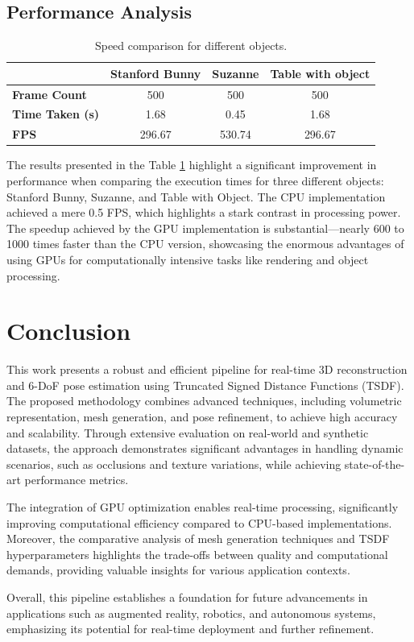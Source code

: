 \documentclass[conference]{IEEEtran}
\begin{document}
\subsection{Performance Analysis}
\begin{table}[htbp]
  \centering
  \begin{tabular}{lccc}
    \toprule
    & \textbf{Stanford Bunny} & \textbf{Suzanne} & \textbf{Table with object} \\
    \midrule
    \textbf{Frame Count} & 500 & 500 & 500 \\
    \textbf{Time Taken (s)} & 1.68 & 0.45 & 1.68 \\
    \textbf{FPS} & 296.67 & 530.74 & 296.67 \\
    \bottomrule
  \end{tabular}
  \caption{Speed comparison for different objects.}
  \label{tab:speed_comparison}
\end{table}
The results presented in the Table \ref{tab:speed_comparison} highlight a significant improvement in performance when comparing the execution times for three different objects: Stanford Bunny, Suzanne, and Table with Object. The CPU implementation achieved a mere 0.5 FPS, which highlights a stark contrast in processing power. The speedup achieved by the GPU implementation is substantial—nearly 600 to 1000 times faster than the CPU version, showcasing the enormous advantages of using GPUs for computationally intensive tasks like rendering and object processing. 


\section{Conclusion}
This work presents a robust and efficient pipeline for real-time 3D reconstruction and 6-DoF pose estimation using Truncated Signed Distance Functions (TSDF). The proposed methodology combines advanced techniques, including volumetric representation, mesh generation, and pose refinement, to achieve high accuracy and scalability. Through extensive evaluation on real-world and synthetic datasets, the approach demonstrates significant advantages in handling dynamic scenarios, such as occlusions and texture variations, while achieving state-of-the-art performance metrics.

The integration of GPU optimization enables real-time processing, significantly improving computational efficiency compared to CPU-based implementations. Moreover, the comparative analysis of mesh generation techniques and TSDF hyperparameters highlights the trade-offs between quality and computational demands, providing valuable insights for various application contexts.

Overall, this pipeline establishes a foundation for future advancements in applications such as augmented reality, robotics, and autonomous systems, emphasizing its potential for real-time deployment and further refinement.



\end{document}
